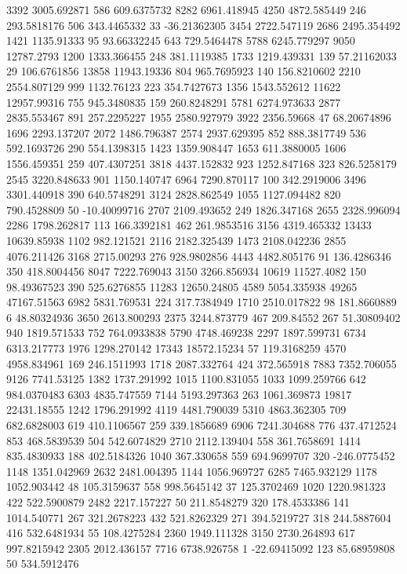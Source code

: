 3392	3005.692871
586	609.6375732
8282	6961.418945
4250	4872.585449
246	293.5818176
506	343.4465332
33	-36.21362305
3454	2722.547119
2686	2495.354492
1421	1135.91333
95	93.66332245
643	729.5464478
5788	6245.779297
9050	12787.2793
1200	1333.366455
248	381.1119385
1733	1219.439331
139	57.21162033
29	106.6761856
13858	11943.19336
804	965.7695923
140	156.8210602
2210	2554.807129
999	1132.76123
223	354.7427673
1356	1543.552612
11622	12957.99316
755	945.3480835
159	260.8248291
5781	6274.973633
2877	2835.553467
891	257.2295227
1955	2580.927979
3922	2356.59668
47	68.20674896
1696	2293.137207
2072	1486.796387
2574	2937.629395
852	888.3817749
536	592.1693726
290	554.1398315
1423	1359.908447
1653	611.3880005
1606	1556.459351
259	407.4307251
3818	4437.152832
923	1252.847168
323	826.5258179
2545	3220.848633
901	1150.140747
6964	7290.870117
100	342.2919006
3496	3301.440918
390	640.5748291
3124	2828.862549
1055	1127.094482
820	790.4528809
50	-10.40099716
2707	2109.493652
249	1826.347168
2655	2328.996094
2286	1798.262817
113	166.3392181
462	261.9853516
3156	4319.465332
13433	10639.85938
1102	982.121521
2116	2182.325439
1473	2108.042236
2855	4076.211426
3168	2715.00293
276	928.9802856
4443	4482.805176
91	136.4286346
350	418.8004456
8047	7222.769043
3150	3266.856934
10619	11527.4082
150	98.49367523
390	525.6276855
11283	12650.24805
4589	5054.335938
49265	47167.51563
6982	5831.769531
224	317.7384949
1710	2510.017822
98	181.8660889
6	48.80324936
3650	2613.800293
2375	3244.873779
467	209.84552
267	51.30809402
940	1819.571533
752	764.0933838
5790	4748.469238
2297	1897.599731
6734	6313.217773
1976	1298.270142
17343	18572.15234
57	119.3168259
4570	4958.834961
169	246.1511993
1718	2087.332764
424	372.565918
7883	7352.706055
9126	7741.53125
1382	1737.291992
1015	1100.831055
1033	1099.259766
642	984.0370483
6303	4835.747559
7144	5193.297363
263	1061.369873
19817	22431.18555
1242	1796.291992
4119	4481.790039
5310	4863.362305
709	682.6828003
619	410.1106567
259	339.1856689
6906	7241.304688
776	437.4712524
853	468.5839539
504	542.6074829
2710	2112.139404
558	361.7658691
1414	835.4830933
188	402.5184326
1040	367.330658
559	694.9699707
320	-246.0775452
1148	1351.042969
2632	2481.004395
1144	1056.969727
6285	7465.932129
1178	1052.903442
48	105.3159637
558	998.5645142
37	125.3702469
1020	1220.981323
422	522.5900879
2482	2217.157227
50	211.8548279
320	178.4533386
141	1014.540771
267	321.2678223
432	521.8262329
271	394.5219727
318	244.5887604
416	532.6481934
55	108.4275284
2360	1949.111328
3150	2730.264893
617	997.8215942
2305	2012.436157
7716	6738.926758
1	-22.69415092
123	85.68959808
50	534.5912476
